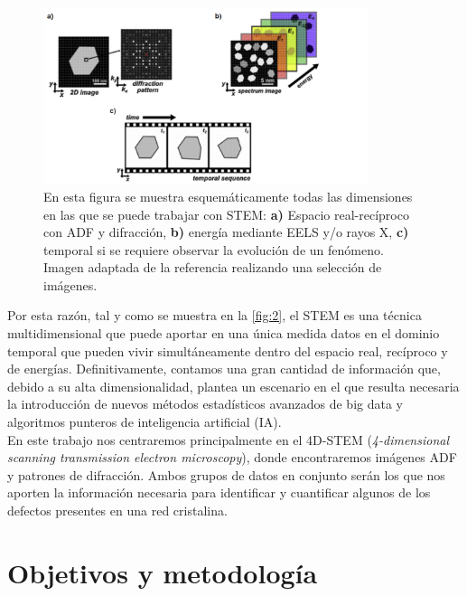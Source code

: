 \begin{figure}[h!]
    \centering
    \includegraphics[width=0.85\textwidth]{fig/Fig2.png}
    \caption{En esta figura se muestra esquemáticamente todas las dimensiones en las que se puede trabajar con STEM: \textbf{a)} Espacio real-recíproco con ADF y difracción, \textbf{b)} energía mediante EELS y/o rayos X, \textbf{c)} temporal si se requiere observar la evolución de un fenómeno. Imagen adaptada de la referencia \cite{foto_intro} realizando una selección de imágenes.}
    \label{fig:2}
\end{figure}

\newpage
Por esta razón, tal y como se muestra en la \autoref{fig:2}, el STEM es una técnica multidimensional que puede aportar en una única medida datos en el dominio temporal que pueden vivir simultáneamente dentro del espacio real, recíproco y de energías. Definitivamente, contamos una gran cantidad de información que, debido a su alta dimensionalidad, plantea un escenario en el que resulta necesaria la introducción de nuevos métodos estadísticos avanzados de big data y algoritmos punteros de inteligencia artificial (IA).\\


En este trabajo nos centraremos principalmente en el 4D-STEM (\textit{4-dimensional scanning transmission electron microscopy}), donde encontraremos imágenes ADF y patrones de difracción. Ambos grupos de datos en conjunto serán los que nos aporten la información necesaria para identificar y cuantificar algunos de los defectos presentes en una red cristalina.\\

\section*{Objetivos y metodología}
 \normalsize

